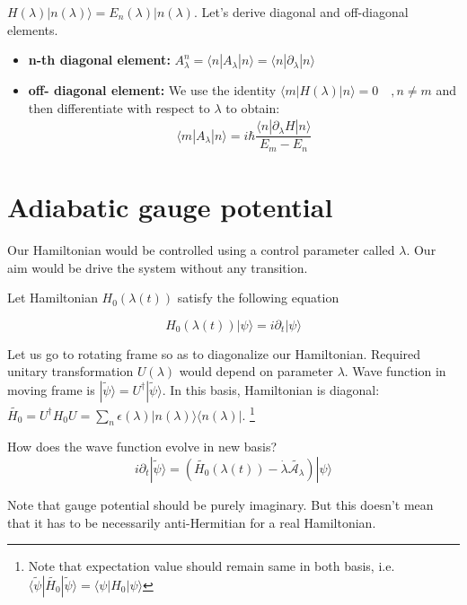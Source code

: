 \documentclass[11pt,a4paper]{article}
\begin{document}
$H (\lambda) |n(\lambda) \rangle = E_n (\lambda) |n(\lambda) $. Let's derive diagonal and off-diagonal elements. 

\begin{itemize}
\item \textbf{n-th diagonal element:} $A_{\lambda}^n= \langle n |A_{\lambda} | n \rangle= \langle n |\partial_{\lambda} | n \rangle $
\item \textbf{off- diagonal element:} We use the identity $\langle m |H(\lambda) | n \rangle=0 \quad, n \neq m$ and then differentiate with respect to $\lambda$ to obtain:
\begin{align}
\langle m |A_{\lambda} | n \rangle = i \hbar \dfrac{\langle n |\partial_{\lambda}H | n \rangle}{E_m-E_n}
\end{align}

\end{itemize}


\section{Adiabatic gauge potential}
Our Hamiltonian would be controlled using a control parameter called $\lambda$. Our aim would be drive the system without any transition.

Let Hamiltonian $H_0(\lambda (t))$ satisfy the following equation

\begin{equation}
H_0(\lambda (t)) |\psi \rangle= i \partial_t|\psi \rangle
\end{equation}

Let us go to rotating frame so as to diagonalize our Hamiltonian. Required unitary transformation $U(\lambda)$ would depend on parameter $\lambda$. Wave function in moving frame is $|\tilde{\psi}  \rangle = U^{\dagger} |\tilde{\psi}  \rangle$. In this basis, Hamiltonian is diagonal:
$\tilde{H_0}= U^{\dagger} H_0 U = \sum_n \epsilon (\lambda)  |n (\lambda)\rangle \langle  n (\lambda) |$. \footnote{Note that expectation value should remain same in both basis, i.e.$ \langle \tilde{\psi} | \tilde{H_0}  |\tilde{\psi}  \rangle= \langle{\psi} | {H_0}  |{\psi}  \rangle$}

How does the wave function evolve in new basis?
\begin{equation}
 i \partial_t|\tilde{\psi} \rangle=(\tilde{H_0
 }(\lambda (t)) - \dot{\lambda} \tilde{\mathcal{A_\lambda}}) |\psi \rangle
\end{equation}

Note that gauge potential should be purely imaginary. But this doesn't mean that it has to be necessarily anti-Hermitian for a real Hamiltonian.
\end{document}
